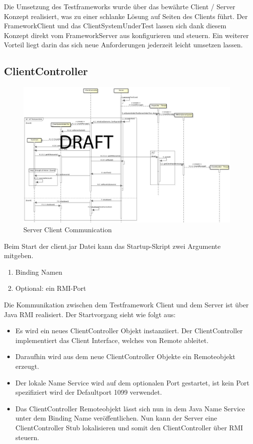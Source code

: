 Die Umsetzung des Testframeworks wurde über das bewährte Client / Server Konzept realisiert, was zu einer schlanke Lösung auf Seiten des Clients führt. Der FrameworkClient und das ClientSystemUnderTest lassen sich dank die\-sem Konzept direkt vom FrameworkServer aus konfigurieren und steuern. Ein weiterer Vorteil liegt darin das sich neue Anforderungen jederzeit leicht umsetzen lassen.


\subsection{ClientController}
\label{sec:clientController}


\begin{figure}
\begin{center}
\includegraphics[scale=0.2]{image_testFramework/TestFWServerClientSeq.png}
\end{center}
\caption{Server Client Communication}
\end{figure}
 
Beim Start der client.jar Datei kann das Startup-Skript zwei Argumente mitgeben.
\begin{enumerate}
\item Binding Namen
\item Optional: ein RMI-Port
\end{enumerate}
Die Kommunikation zwischen dem Testframework Client und dem Server ist über Java RMI realisiert. Der Startvorgang sieht wie folgt aus:
\begin{itemize}
\item Es wird ein neues ClientController Objekt instanziiert. Der ClientController implementiert das Client Interface, welches von Remote ableitet.
\item Daraufhin wird aus dem neue ClientController Objekte ein Remoteobjekt erzeugt.
\item Der lokale Name Service wird auf dem optionalen Port gestartet, ist kein Port spezifiziert wird der Defaultport 1099 verwendet.
\item Das ClientController Remoteobjekt lässt sich nun in dem Java Name Service unter dem Binding Name veröffentlichen. Nun kann der Server eine ClientController Stub lokalisieren und somit den ClientController über RMI steuern.
\end{itemize}

